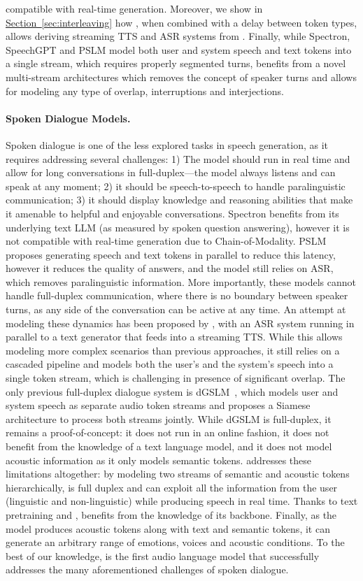 compatible with real-time generation. Moreover, we show in \hyperref[sec:interleaving]{Section~\ref{sec:interleaving}} how \interleaving, when combined with a delay between token types, allows deriving streaming TTS and ASR systems from \ours{}. Finally, while Spectron, SpeechGPT and PSLM model both user and system speech and text tokens into a single stream, which requires properly segmented turns, \ours{} benefits from a novel multi-stream architectures which removes the concept of speaker turns and allows for modeling any type of overlap, interruptions and interjections.

\paragraph{Spoken Dialogue Models.}
Spoken dialogue is one of the less explored tasks in speech generation, as it requires addressing several challenges: 1) The model should run in real time and allow for long conversations in full-duplex---the model always listens and can speak at any moment; 2) it should be speech-to-speech to handle paralinguistic communication; 3) it should display knowledge and reasoning abilities that make it amenable to helpful and enjoyable conversations. Spectron benefits from its underlying text LLM (as measured by spoken question answering), however it is not compatible with real-time generation due to Chain-of-Modality. PSLM proposes generating speech and text tokens in parallel to reduce this latency, however it reduces the quality of answers, and the model still relies on ASR, which removes paralinguistic information. More importantly, these models cannot handle full-duplex communication, where there is no boundary between speaker turns, as any side of the conversation can be active at any time. An attempt at modeling these dynamics has been proposed by \citet{fullduplexfsm}, with an ASR system running in parallel to a text generator that feeds into a streaming TTS. While this allows modeling more complex scenarios than previous approaches, it still relies on a cascaded pipeline and models both the user's and the system's speech into a single token stream, which is challenging in presence of significant overlap. The only previous full-duplex dialogue system is dGSLM~\citep{nguyen-etal-2023-generative}, which models user and system speech as separate audio token streams and proposes a Siamese architecture to process both streams jointly. While dGSLM is full-duplex, it remains a proof-of-concept: it does not run in an online fashion, it does not benefit from the knowledge of a text language model, and it does not model acoustic information as it only models semantic tokens. \ours{} addresses these limitations altogether: by modeling two streams of semantic and acoustic tokens hierarchically, \ours{} is full duplex and can exploit all the information from the user (linguistic and non-linguistic) while producing speech in real time. Thanks to text pretraining and \interleaving, \ours{} benefits from the knowledge of its \helium backbone. Finally, as the model produces acoustic tokens along with text and semantic tokens, it can generate an arbitrary range of emotions, voices and acoustic conditions. To the best of our knowledge, \ours{} is the first audio language model that successfully addresses the many aforementioned challenges of spoken dialogue.

